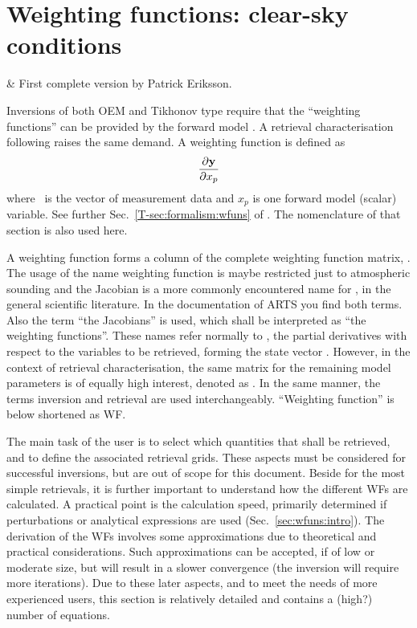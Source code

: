 \chapter{Weighting functions: clear-sky conditions}
 \label{sec:wfuns}

  & First complete version by Patrick Eriksson.\\
 \stophistory

\graphicspath{{Figs/wfuns/}}


Inversions of both OEM and Tikhonov type require that the ``weighting
functions'' can be provided by the forward model \citep[see
e.g.][]{eriksson:analy:00}. A retrieval characterisation following
\citet{rodgers:90,rodgers:00} raises the same demand. A weighting function is
defined as
\begin{equation}
  \frac{\partial \mathbf{y}}{\partial x_p}
  \label{eq:wfuns:ki}
\end{equation}
where \MsrVct\ is the vector of measurement data and $x_p$ is one forward model
(scalar) variable. See further Sec.~\ref{T-sec:formalism:wfuns} of \theory.
The nomenclature of that section is also used here.

A weighting function forms a column of the complete weighting function matrix,
\aWfnMtr{\SttVct}. The usage of the name weighting function is maybe restricted
just to atmospheric sounding and the Jacobian is a more commonly encountered
name for \aWfnMtr{\SttVct}, in the general scientific literature. In the
documentation of ARTS you find both terms. Also the term ``the Jacobians'' is
used, which shall be interpreted as ``the weighting functions''. These names
refer normally to \aWfnMtr{\SttVct}, the partial derivatives with respect to
the variables to be retrieved, forming the state vector \SttVct. However, in
the context of retrieval characterisation, the same matrix for the remaining
model parameters is of equally high interest, denoted as \aWfnMtr{\FrwMdlVct}.
In the same manner, the terms inversion and retrieval are used interchangeably.
``Weighting function'' is below shortened as WF.

The main task of the user is to select which quantities that shall be
retrieved, and to define the associated retrieval grids. These aspects must be
considered for successful inversions, but are out of scope for this document.
Beside for the most simple retrievals, it is further important to understand
how the different WFs are calculated. A practical point is the calculation
speed, primarily determined if perturbations or analytical expressions are used
(Sec.~\ref{sec:wfuns:intro}). The derivation of the WFs involves some
approximations due to theoretical and practical considerations. Such
approximations can be accepted, if of low or moderate size, but will result in
a slower convergence (the inversion will require more iterations). Due to these
later aspects, and to meet the needs of more experienced users, this section is
relatively detailed and contains a (high?) number of equations.

